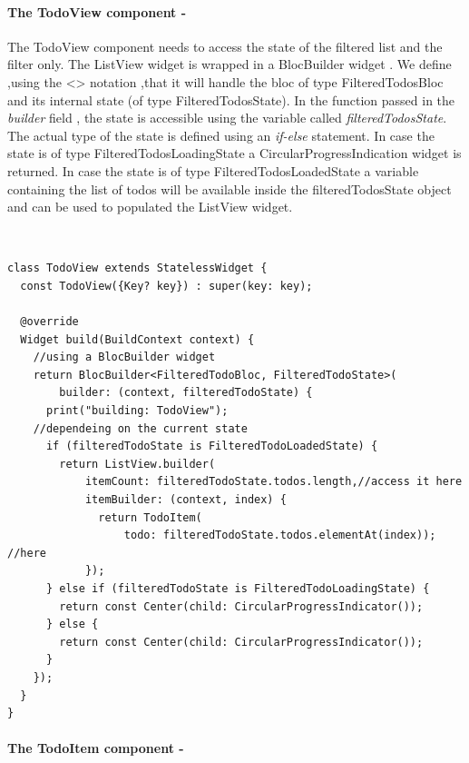 \paragraph{The TodoView component - }
\label{subpar:todo_app_bloc_core_state}

The TodoView component needs to access the state of the filtered list and the filter only. The ListView widget is wrapped in a BlocBuilder widget . We define ,using the <> notation ,that it will handle the bloc of type FilteredTodosBloc and its internal state (of type FilteredTodosState). In the function passed in the \textit{builder} field , the state is accessible using the variable called \textit{filteredTodosState}. The actual type of the state is defined using an \textit{if-else} statement. In case the state is of type FilteredTodosLoadingState a CircularProgressIndication widget is returned. In case the state is of type FilteredTodosLoadedState a variable containing the list of todos will be available inside the filteredTodosState object and can be used to populated the ListView widget.\begin{code}
\mbox{}\\
 \mbox{}
\label{code:2.14}
\begin{verbatim}
class TodoView extends StatelessWidget {
  const TodoView({Key? key}) : super(key: key);

  @override
  Widget build(BuildContext context) {
    //using a BlocBuilder widget
    return BlocBuilder<FilteredTodoBloc, FilteredTodoState>(
        builder: (context, filteredTodoState) {
      print("building: TodoView");
	//dependeing on the current state
      if (filteredTodoState is FilteredTodoLoadedState) {
        return ListView.builder(
            itemCount: filteredTodoState.todos.length,//access it here
            itemBuilder: (context, index) {
              return TodoItem(
                  todo: filteredTodoState.todos.elementAt(index)); //here
            });
      } else if (filteredTodoState is FilteredTodoLoadingState) {
        return const Center(child: CircularProgressIndicator());
      } else {
        return const Center(child: CircularProgressIndicator());
      }
    });
  }
}
\end{verbatim}
\mbox{}
\end{code}

\paragraph{The TodoItem component - }
\label{subpar:todo_app_bloc_core_state}

